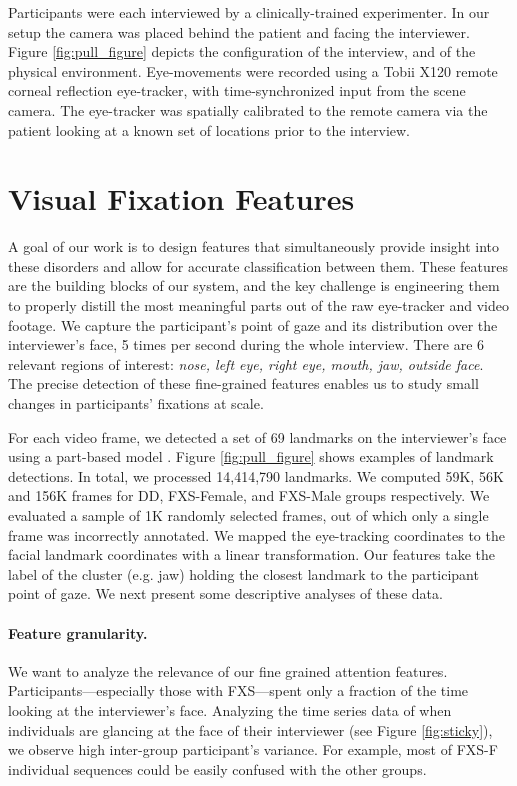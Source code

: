 \documentclass{llncs}
\begin{document}
  Participants were each interviewed by a clinically-trained experimenter. In our setup the camera was placed behind the patient and facing the interviewer. Figure \ref{fig:pull_figure} depicts the configuration of the interview, and of the physical environment. Eye-movements were recorded using a Tobii X120 remote corneal reflection eye-tracker, with time-synchronized input from the scene camera. The eye-tracker was spatially calibrated to the remote camera via the patient looking at a known set of locations prior to the interview.

  \vspace{-2 em}
  \section{Visual Fixation Features}
  \vspace{-1 em}
  \label{sec:feature_extraction}
A goal of our work is to design features that simultaneously provide insight into these disorders and allow for accurate classification between them. These features are the building blocks of our system, and the key challenge is engineering them to properly distill the most meaningful parts out of the raw eye-tracker and video footage. We capture the participant's point of gaze and its distribution over the interviewer's face, 5 times per second during the whole interview. There are 6 relevant regions of interest: \textit{nose, left eye, right eye, mouth, jaw, outside face}. The precise detection of these fine-grained features enables us to study small changes in participants' fixations at scale.

For each video frame, we detected a set of 69 landmarks on the interviewer's face using a part-based model \cite{dpmface}. Figure \ref{fig:pull_figure} shows examples of landmark detections. In total, we processed 14,414,790 landmarks. 
We computed 59K, 56K and 156K frames for DD, FXS-Female, and FXS-Male groups respectively. We evaluated a sample of 1K randomly selected frames, out of which only a single frame was incorrectly annotated. We mapped the eye-tracking coordinates to the facial landmark coordinates with a linear transformation. Our features take the label of the cluster (e.g. jaw) holding the closest landmark to the participant point of gaze. We next present some descriptive analyses of these data.

\paragraph{Feature granularity.} We want to analyze the relevance of our fine grained attention features.
Participants---especially those with FXS---spent only a fraction of the time looking at the interviewer's face. Analyzing the time series data of when individuals are glancing at the face of their interviewer (see Figure \ref{fig:sticky}), we observe high inter-group participant's variance. For example, most of FXS-F individual sequences could be easily confused with the other groups.
\end{document}
